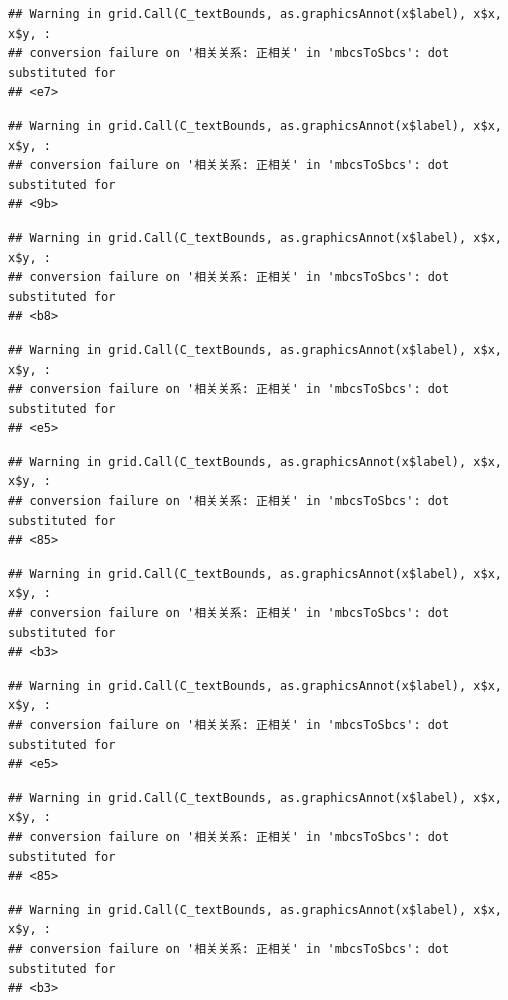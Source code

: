 \documentclass[
]{book}
\begin{document}
\begin{verbatim}
## Warning in grid.Call(C_textBounds, as.graphicsAnnot(x$label), x$x, x$y, :
## conversion failure on '相关关系: 正相关' in 'mbcsToSbcs': dot substituted for
## <e7>
\end{verbatim}

\begin{verbatim}
## Warning in grid.Call(C_textBounds, as.graphicsAnnot(x$label), x$x, x$y, :
## conversion failure on '相关关系: 正相关' in 'mbcsToSbcs': dot substituted for
## <9b>
\end{verbatim}

\begin{verbatim}
## Warning in grid.Call(C_textBounds, as.graphicsAnnot(x$label), x$x, x$y, :
## conversion failure on '相关关系: 正相关' in 'mbcsToSbcs': dot substituted for
## <b8>
\end{verbatim}

\begin{verbatim}
## Warning in grid.Call(C_textBounds, as.graphicsAnnot(x$label), x$x, x$y, :
## conversion failure on '相关关系: 正相关' in 'mbcsToSbcs': dot substituted for
## <e5>
\end{verbatim}

\begin{verbatim}
## Warning in grid.Call(C_textBounds, as.graphicsAnnot(x$label), x$x, x$y, :
## conversion failure on '相关关系: 正相关' in 'mbcsToSbcs': dot substituted for
## <85>
\end{verbatim}

\begin{verbatim}
## Warning in grid.Call(C_textBounds, as.graphicsAnnot(x$label), x$x, x$y, :
## conversion failure on '相关关系: 正相关' in 'mbcsToSbcs': dot substituted for
## <b3>
\end{verbatim}

\begin{verbatim}
## Warning in grid.Call(C_textBounds, as.graphicsAnnot(x$label), x$x, x$y, :
## conversion failure on '相关关系: 正相关' in 'mbcsToSbcs': dot substituted for
## <e5>
\end{verbatim}

\begin{verbatim}
## Warning in grid.Call(C_textBounds, as.graphicsAnnot(x$label), x$x, x$y, :
## conversion failure on '相关关系: 正相关' in 'mbcsToSbcs': dot substituted for
## <85>
\end{verbatim}

\begin{verbatim}
## Warning in grid.Call(C_textBounds, as.graphicsAnnot(x$label), x$x, x$y, :
## conversion failure on '相关关系: 正相关' in 'mbcsToSbcs': dot substituted for
## <b3>
\end{verbatim}
\end{document}
